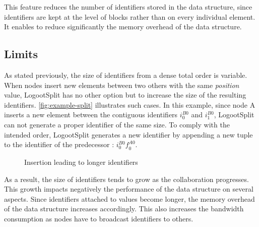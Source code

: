 \documentclass[10pt,journal,compsoc]{IEEEtran}
\let\MYoriglatexcaption\caption
\renewcommand{\caption}[2][\relax]{\MYoriglatexcaption[#2]{#2}}
\newcommand{\trm}[1]{\mathit{#1}}
\newcommand{\id}[3]{$\trm{#1}^{\trm{#2}}_{\trm{#3}}$}
\newcommand{\widthletter}{2em}
\begin{document}
This feature reduces the number of identifiers stored in the data structure, since identifiers are kept at the level of blocks rather than on every individual element.
It enables to reduce significantly the memory overhead of the data structure.

\subsection{Limits}

As stated previously, the size of identifiers from a dense total order is variable.
When nodes insert new elements between two others with the same \emph{position} value, LogootSplit has no other option but to increase the size of the resulting identifiers.
\autoref{fig:example-split} illustrates such cases.
In this example, since node A inserts a new element between the contiguous identifiers \id{i}{B0}{0} and \id{i}{B0}{1}, LogootSplit can not generate a proper identifier of the same size.
To comply with the intended order, LogootSplit generates a new identifier by appending a new tuple to the identifier of the predecessor : \id{i}{B0}{0}\id{f}{A0}{0}.

\begin{figure}[t!]
    \centering
    \caption{Insertion leading to longer identifiers}
    \label{fig:example-split}
\end{figure}

As a result, the size of identifiers tends to grow as the collaboration progresses.
This growth impacts negatively the performance of the data structure on several aspects.
Since identifiers attached to values become longer, the memory overhead of the data structure increases accordingly.
This also increases the bandwidth consumption as nodes have to broadcast identifiers to others.
\end{document}
